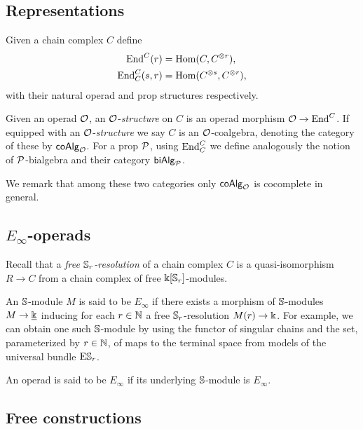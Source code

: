 \subsection{Representations}

Given a chain complex $C$ define
\begin{align*}
\End^C(r) &= \Hom(C, C^{\otimes r}), \\
\End^C_C(s, r) &= \Hom(C^{\otimes s}, C^{\otimes r}),
\end{align*}
with their natural operad and prop structures respectively.

Given an operad $\O$, an $\O$-\textit{structure} on $C$ is an operad morphism $\O \to \End^C$.
If equipped with an $\O$-\textit{structure} we say $C$ is an $\O$-coalgebra, denoting the category of these by $\coAlg_\O$.
For a prop $\P$, using $\End_C^C$ we define analogously the notion of $\P$-bialgebra and their category $\biAlg_\P$.

We remark that among these two categories only $\coAlg_\O$ is cocomplete in general.

\subsection{$E_{\infty}$-operads}

Recall that a \textit{free $\S_r$-resolution} of a chain complex $C$ is a quasi-isomorphism $R \to C$ from a chain complex of free $\k[\S_r]$-modules.

An $\S$-module $M$ is said to be $E_{\infty}$ if there exists a morphism of $\S$-modules $M \to \underline{\k}$ inducing for each $r \in \N$ a free $\S_r$-resolution $M(r) \to \k$.
For example, we can obtain one such $\S$-module by using the functor of singular chains and the set, parameterized by $r \in \N$, of maps to the terminal space from models of the universal bundle $\mathrm{E} \S_r$.

An operad is said to be $E_{\infty}$ if its underlying $\S$-module is $E_\infty$.

\subsection{Free constructions} \label{ss:free constructions}

